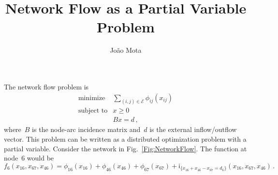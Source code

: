 \documentclass[letter,10pt]{article}
\title{Network Flow as a Partial Variable Problem}
\author{Jo\~ao Mota}
\theoremstyle{definition}
\theoremstyle{nonumberplain}
\begin{document}
\maketitle


		The network flow problem is
		\begin{equation}\label{Eq:20SetNetFlowProb}
			\begin{array}{ll}
				\text{minimize} & \sum_{(i,j) \in \mathcal{E}} \phi_{ij}(x_{ij}) \\
				\text{subject to} & x \geq 0 \\
				                  & Bx = d\,,
			\end{array}
		\end{equation}
		where~$B$ is the node-arc incidence matrix and~$d$ is the external inflow/outflow vector. This problem can be written as a distributed optimization problem with a partial variable. Consider the network in Fig.~\ref{Fig:NetworkFlow}. The function at node~$6$ would be
		$$
			f_6(x_{16},x_{67},x_{46}) = \phi_{16}(x_{16}) + \phi_{46}(x_{46}) + \phi_{67}(x_{67}) + \textsf{i}_{\{x_{16} + x_{46} - x_{67} = d_6\}}(x_{16},x_{67},x_{46})\,.
		$$
\end{document}

